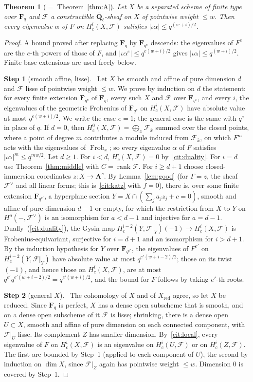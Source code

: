 \documentclass[11pt,a4paper]{article}
\theoremstyle{plain}
\newtheorem{theorem}{Theorem}[section]
\theoremstyle{definition}
\theoremstyle{remark}
\newcommand{\step}[2]{\par\smallskip\noindent\textbf{Step #1} (#2).\ \ignorespaces}
\newcommand{\Fq}{\mathbf F_q}
\newcommand{\Ql}{\overline{\mathbf Q}_\ell}
\newcommand{\A}{\mathbf A}
\newcommand{\F}{\mathcal F}
\newcommand{\Frob}{\operatorname{Frob}}
\begin{document}
\begin{theorem}[$=$ Theorem~\ref{thm:A}]\label{thm:all}
Let $X$ be a separated scheme of finite type over $\Fq$ and $\F$ a constructible $\Ql$-sheaf on $X$ of pointwise weight
$\le w$. Then every eigenvalue $\alpha$ of $F$ on $H^i_c(X,\F)$ satisfies $|\iota\alpha|\le q^{(w+i)/2}$.
\end{theorem}
\begin{proof}
A bound proved after replacing $\Fq$ by $\mathbf F_{q^e}$ descends: the eigenvalues of $F^e$ are the $e$-th powers of
those of $F$, and $|\iota\alpha^e|\le q^{e(w+i)/2}$ gives $|\iota\alpha|\le q^{(w+i)/2}$. Finite base extensions are used
freely below.

\step{1}{smooth affine, lisse} Let $X$ be smooth and affine of pure dimension $d$ and $\F$ lisse of pointwise weight
$\le w$. We prove by induction on $d$ the statement: for every finite extension $\mathbf F_{q^e}$ of $\Fq$, every such
$X$ and $\F$ over $\mathbf F_{q^e}$, and every $i$, the eigenvalues of the geometric Frobenius of $\mathbf F_{q^e}$ on
$H^i_c(X,\F)$ have absolute value at most $q^{e(w+i)/2}$. We write the case $e=1$; the general case is the same with
$q^e$ in place of $q$. If $d=0$, then $H^0_c(X,\F)=\bigoplus_x\F_{\bar x}$ summed over the closed points, where a point of degree $m$
contributes a module induced from $\F_{\bar x}$, on which $F^m$ acts with the eigenvalues of $\Frob_x$; so every
eigenvalue $\alpha$ of $F$ satisfies $|\iota\alpha|^m\le q^{mw/2}$. Let $d\ge1$. For $i<d$, $H^i_c(X,\F)=0$
by~\ref{cit:duality}. For $i=d$ use Theorem~\ref{thm:middle} with $C=\operatorname{rank}\F$. For $i\ge d+1$ choose
closed-immersion coordinates $z:X\to\A^s$. By Lemma~\ref{lem:good} (for $\Gamma=z$, the sheaf $\F^\vee$ and all linear
forms; this is~\ref{cit:katz} with $f=0$), there is, over some finite extension $\mathbf F_{q^{e'}}$, a hyperplane section
$Y=X\cap(\sum_ja_jz_j+c=0)$, smooth and affine of pure dimension $d-1$ or empty, for which the restriction from $X$ to $Y$
on $H^a(-,\F^\vee)$ is an isomorphism for $a<d-1$ and injective for $a=d-1$. Dually~(\ref{cit:duality}), the Gysin map
$H^{i-2}_c(Y,\F|_Y)(-1)\to H^i_c(X,\F)$ is Frobenius-equivariant, surjective for $i=d+1$ and an isomorphism for
$i>d+1$. By the induction hypothesis for $Y$ over $\mathbf F_{q^{e'}}$, the eigenvalues of $F^{e'}$ on
$H^{i-2}_c(Y,\F|_Y)$ have absolute value at most $q^{e'(w+i-2)/2}$; those on its twist $(-1)$, and hence those on
$H^i_c(X,\F)$, are at most $q^{e'}q^{e'(w+i-2)/2}=q^{e'(w+i)/2}$, and the bound for $F$ follows by taking $e'$-th roots.

\step{2}{general $X$} The cohomology of $X$ and of $X_{\mathrm{red}}$ agree, so let $X$ be reduced. Since $\Fq$ is perfect,
$X$ has a dense open subscheme that is smooth, and on a dense open subscheme of it $\F$ is lisse; shrinking, there is a
dense open $U\subset X$, smooth and affine of pure dimension on each connected component, with $\F|_U$ lisse. Its
complement $Z$ has smaller dimension. By~\ref{cit:local}, every eigenvalue of $F$ on $H^i_c(X,\F)$ is an eigenvalue on
$H^i_c(U,\F)$ or on $H^i_c(Z,\F)$. The first are bounded by Step~1 (applied to each component of $U$), the second by
induction on $\dim X$, since $\F|_Z$ again has pointwise weight $\le w$. Dimension $0$ is covered by Step~1.
\end{proof}
\end{document}

